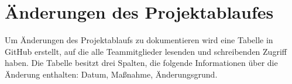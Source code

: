 \documentclass[lang=ngerman,inputenc=utf8,fontsize=10pt]{ldvarticle}
\begin{document}
\section{Änderungen des Projektablaufes}
Um Änderungen des Projektablaufs zu dokumentieren wird eine Tabelle in GitHub erstellt, auf die alle Teammitglieder lesenden und schreibenden Zugriff haben. Die Tabelle besitzt drei Spalten, die folgende Informationen über die Änderung enthalten: Datum, Maßnahme, Änderungsgrund.
\end{document}
